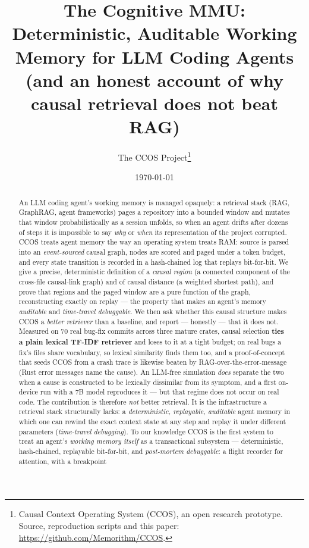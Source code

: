 \documentclass[11pt]{article}
\title{\textbf{The Cognitive MMU:\\ Deterministic, Auditable Working Memory for LLM Coding Agents\\ \large (and an honest account of why causal retrieval does not beat RAG)}}
\author{The CCOS Project\thanks{Causal Context Operating System (CCOS), an open
research prototype. Source, reproduction scripts and this paper:
\url{https://github.com/Memorithm/CCOS}.}}
\date{\today}
\begin{document}
\maketitle

\begin{abstract}
An LLM coding agent's working memory is managed opaquely: a retrieval stack (RAG,
GraphRAG, agent frameworks) pages a repository into a bounded window and mutates
that window probabilistically as a session unfolds, so when an agent drifts after
dozens of steps it is impossible to say \emph{why} or \emph{when} its
representation of the project corrupted. CCOS treats agent memory the way an
operating system treats RAM: source is parsed into an \emph{event-sourced} causal
graph, nodes are scored and paged under a token budget, and every state transition
is recorded in a hash-chained log that replays bit-for-bit. We give a precise,
deterministic definition of a \emph{causal region} (a connected component of the
cross-file causal-link graph) and of causal distance (a weighted shortest path),
and prove that regions and the paged window are a pure function of the graph,
reconstructing exactly on replay --- the property that makes an agent's memory
\emph{auditable} and \emph{time-travel debuggable}. We then ask whether this causal structure makes CCOS a \emph{better retriever}
than a baseline, and report --- honestly --- that it does not. Measured on $70$
real bug-fix commits across three mature crates, causal selection \textbf{ties a
plain lexical TF-IDF retriever} and loses to it at a tight budget; on real bugs a
fix's files share vocabulary, so lexical similarity finds them too, and a
proof-of-concept that seeds CCOS from a crash trace is likewise beaten by
RAG-over-the-error-message (Rust error messages name the cause). An LLM-free
simulation \emph{does} separate the two when a cause is constructed to be
lexically dissimilar from its symptom, and a first on-device run with a $7$B model
reproduces it --- but that regime does not occur on real code. The contribution is
therefore \emph{not} better retrieval. It is the infrastructure a retrieval stack
structurally lacks: a \emph{deterministic, replayable, auditable} agent memory in
which one can rewind the exact context state at any step and replay it under
different parameters (\emph{time-travel debugging}). To our knowledge CCOS is the
first system to treat an agent's \emph{working memory itself} as a transactional
subsystem --- deterministic, hash-chained, replayable bit-for-bit, and
\emph{post-mortem debuggable}: a flight recorder for attention, with a breakpoint

\end{abstract}
\end{document}
